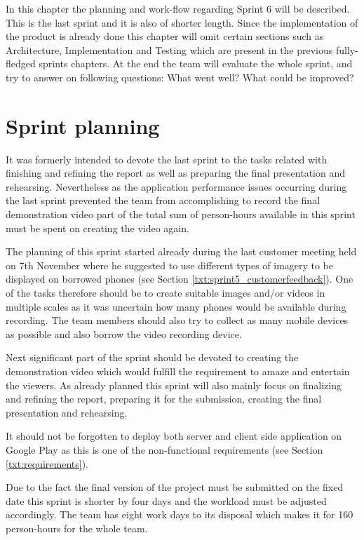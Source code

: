 In this chapter the planning and work-flow regarding Sprint 6 will be described. This is the last sprint and it is also of shorter length. Since the implementation of the product is already done this chapter will omit certain sections such as Architecture, Implementation and Testing which are present in the previous fully-fledged sprints chapters. At the end the team will evaluate the whole sprint, and try to answer on following questions: What went well? What could be improved?  

\section{Sprint planning}
It was formerly intended to devote the last sprint to the tasks related with finishing and refining the report as well as preparing the final presentation and rehearsing. Nevertheless as the application performance issues occurring during the last sprint prevented the team from accomplishing to record the final demonstration video part of the total sum of person-hours available in this sprint must be spent on creating the video again.

The planning of this sprint started already during the last customer meeting held on 7th November where he suggested to use different types of imagery to be displayed on borrowed phones (see Section \ref{txt:sprint5_customerfeedback}). One of the tasks therefore should be to create suitable images and/or videos in multiple scales as it was uncertain how many phones would be available during recording. The team members should also try to collect as many mobile devices as possible and also borrow the video recording device.

Next significant part of the sprint should be devoted to creating the demonstration video which would fulfill the requirement to amaze and entertain the viewers. As already planned this sprint will also mainly focus on finalizing and refining the report, preparing it for the submission, creating the final presentation and rehearsing.

It should not be forgotten to deploy both server and client side application on Google Play as this is one of the non-functional requirements (see Section \ref{txt:requirements}).

Due to the fact the final version of the project must be submitted on the fixed date this sprint is shorter by four days and the workload must be adjusted accordingly. The team has eight work days to its disposal which makes it for 160 person-hours for the whole team.

